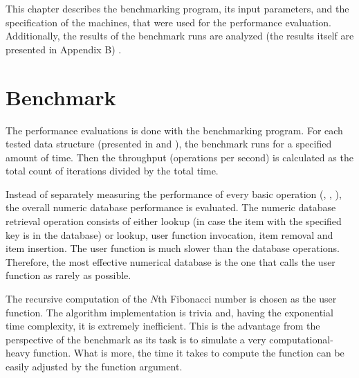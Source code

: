 This chapter describes the benchmarking program, its input parameters, and the specification of the machines, that were used for the performance evaluation. Additionally, the results of the benchmark runs are analyzed (the results itself are presented in Appendix B) .

\section{Benchmark}

The performance evaluations is done with the benchmarking program. For each tested data structure (presented in  and ), the benchmark runs for a specified amount of time. Then the throughput (operations per second) is calculated as the total count of iterations divided by the total time.

Instead of separately measuring the performance of every basic operation (\findop, \insertop, \removeop), the overall numeric database performance is evaluated. The numeric database retrieval operation consists of either lookup (in case the item with the specified key is in the database) or lookup, user function invocation, item removal and item insertion. The user function is much slower than the database operations. Therefore, the most effective numerical database is the one that calls the user function as rarely as possible.

The recursive computation of the $N$th Fibonacci number is chosen as the user function. The algorithm implementation is trivia and, having the exponential time complexity, it is extremely inefficient. This is the advantage from the perspective of the benchmark as its task is to simulate a very computational-heavy function. What is more, the time it takes to compute the function can be easily adjusted by the function argument.

